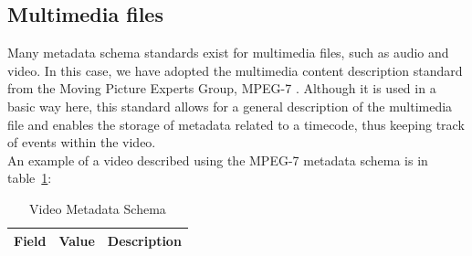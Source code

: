\subsection{Multimedia files}
Many metadata schema standards exist for multimedia files, such as audio and video. In this case, we have adopted the multimedia content description standard from the Moving Picture Experts Group, MPEG-7 \cite{MPEG7}. Although it is used in a basic way here, this standard allows for a general description of the multimedia file and enables the storage of metadata related to a timecode, thus keeping track of events within the video.\\
An example of a video described using the MPEG-7 metadata schema is in table~\ref{tab:c4-video}:

\begin{longtable}{|p{}|p{}|p{}|}
    \caption{Video Metadata Schema} \label{tab:c4-video} \\
    \hline
    \textbf{Field} & \textbf{Value} & \textbf{Description} \\
    \hline


\end{longtable}
